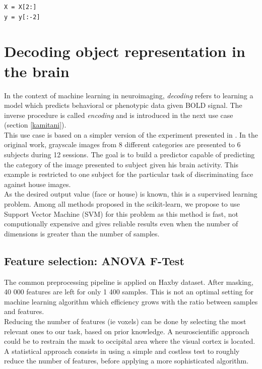 \documentclass{frontiersSCNS} %
\begin{document}
\begin{lstlisting}
X = X[2:]
y = y[:-2]
\end{lstlisting}

\section{Decoding object representation in the brain}

In the context of machine learning in neuroimaging, \textit{decoding} refers to learning a model
which predicts behavioral or phenotypic data given BOLD signal. The inverse procedure is
called \textit{encoding} \citep{naselaris2011} and is introduced in the next use case
(section \ref{kamitani}).\\

This use case is based on a simpler version of the experiment presented in
\cite{haxby2001}. In the original work, grayscale images from 8 different categories
are presented to 6 subjects during 12 sessions. The goal is to build a predictor
capable of predicting the category of the image presented to subject given his
brain activity. This example is restricted to one subject for the
particular task of discriminating face against house images.\\

As the desired output value (face or house) is known, this is a
supervised learning problem.
Among all methods proposed in the scikit-learn, we propose to use
Support Vector Machine (SVM) for this problem as this method is fast, not
computionally expensive and gives reliable results even when the number of
dimensions is greater than the number of samples.

\subsection{Feature selection: ANOVA F-Test}

The common preprocessing pipeline is applied on Haxby dataset. After masking, 40
000 features are left for only 1 400 samples. This is not an optimal setting
for machine learning algorithm which efficiency grows with the ratio
between samples and features.\\

Reducing the number of features (ie voxels) can be done by selecting the most
relevant ones to our task, based on prior knowledge.
A neuroscientific approach could be to restrain the
mask to occipital area where the visual cortex is located. A statistical
approach consists in using a simple and costless test to roughly reduce the
number of features, before applying a more sophisticated algorithm.\\
\end{document}
